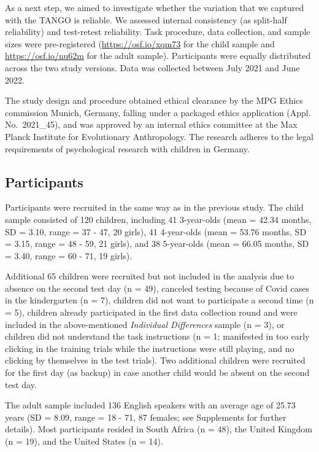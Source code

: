 \documentclass[
  man,floatsintext]{apa7}
\begin{document}
As a next step, we aimed to investigate whether the variation that we captured with the TANGO is reliable.
We assessed internal consistency (as split-half reliability) and test-retest reliability.
Task procedure, data collection, and sample sizes were pre-registered (\url{https://osf.io/xqm73} for the child sample and \url{https://osf.io/nu62m} for the adult sample).
Participants were equally distributed across the two study versions.
Data was collected between July 2021 and June 2022.

The study design and procedure obtained ethical clearance by the MPG Ethics commission Munich, Germany, falling under a packaged ethics application (Appl. No.~2021\_45), and was approved by an internal ethics committee at the Max Planck Institute for Evolutionary Anthropology.
The research adheres to the legal requirements of psychological research with children in Germany.

\hypertarget{participants-1}{%
\subsection{Participants}\label{participants-1}}

Participants were recruited in the same way as in the previous study.
The child sample consisted of 120 children, including 41 3-year-olds (mean = 42.34 months, SD = 3.10, range = 37 - 47, 20 girls), 41 4-year-olds (mean = 53.76 months, SD = 3.15, range = 48 - 59, 21 girls), and 38 5-year-olds (mean = 66.05 months, SD = 3.40, range = 60 - 71, 19 girls).

Additional 65 children were recruited but not included in the analysis due to absence on the second test day (n = 49), canceled testing because of Covid cases in the kindergarten (n = 7), children did not want to participate a second time (n = 5), children already participated in the first data collection round and were included in the above-mentioned \emph{Individual Differences} sample (n = 3), or children did not understand the task instructions (n = 1; manifested in too early clicking in the training trials while the instructions were still playing, and no clicking by themselves in the test trials).
Two additional children were recruited for the first day (as backup) in case another child would be absent on the second test day.

The adult sample included 136 English speakers with an average age of 25.73 years (SD = 8.09, range = 18 - 71, 87 females; see Supplements for further details).
Most participants resided in South Africa (n = 48), the United Kingdom (n = 19), and the United States (n = 14).
\end{document}
